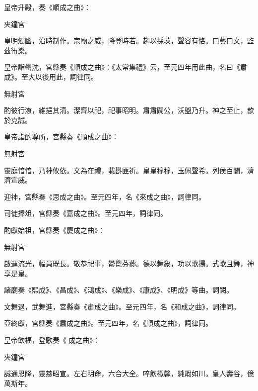 \begin{pinyinscope}
 皇帝升殿，奏《順成之曲》：



 夾鐘宮



 皇明燭幽，沿時制作。宗廟之威，降登時若。趨以採茨，聲容有恪。曰藝曰文，監茲衎樂。



 皇帝詣罍洗，宮縣奏《順成之曲》：《太常集禮》云，至元四年用此曲，名曰《肅成》。至大以後用此，詞律同。



 無射宮



 酌彼行潦，維挹其清。潔齊以祀，祀事昭明。肅肅闢公，沃盥乃升。神之至止，歆於克誠。



 皇帝詣酌尊所，宮縣奏《順成之曲》：



 無射宮



 靈庭愔愔，乃神攸依。文為在禮，載斟匪祈。皇皇穆穆，玉佩聲希。列侯百闢，濟濟宣威。



 迎神，宮縣奏《思成之曲》。至元四年，名《來成之曲》，詞律同。



 司徒捧俎，宮縣奏《嘉成之曲》。至元四年，詞律同。



 酌獻始祖，宮縣奏《慶成之曲》：



 無射宮



 啟運流光，幅員既長。敬恭祀事，鬱鬯芬薌。德以舞象，功以歌揚。式歌且舞，神享是皇。



 諸廟奏《熙成》、《昌成》、《鴻成》、《樂成》、《康成》、《明成》等曲。詞闕。



 文舞退，武舞進，宮縣奏《肅成之曲》。至元四年，名《和成之曲》，詞律同。



 亞終獻，宮縣奏《肅成之曲》。至元四年，名《順成之曲》，詞律同。



 皇帝飲福，登歌奏《成之曲》：



 夾鐘宮



 誠通恩降，靈慈昭宣。左右明命，六合大全。啐飲椒馨，純嘏如川。皇人壽谷，億萬斯年。




\end{pinyinscope}
